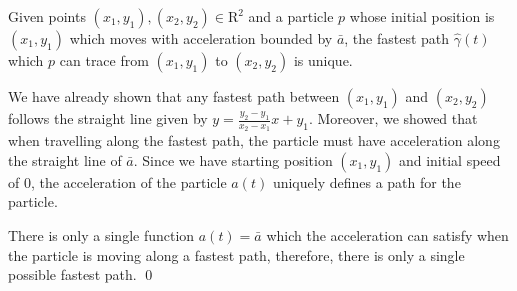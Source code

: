 \begin{corollary}
  Given points $(x_1, y_1), (x_2, y_2) \in \mathrm{R}^2$ and a particle $p$ whose initial position is $(x_1, y_1)$ which moves with acceleration bounded by $\bar{a}$, the fastest path $\hat{\gamma}(t)$ which $p$ can trace from $(x_1, y_1)$ to $(x_2, y_2)$ is unique.
\end{corollary}
\proof We have already shown that any fastest path between $(x_1, y_1)$ and $(x_2, y_2)$ follows the straight line given by $y = \frac{y_2 - y_1}{x_2 - x_1} x + y_1$. Moreover, we showed that when travelling along the fastest path, the particle must have acceleration along the straight line of $\bar{a}$. Since we have starting position $(x_1, y_1)$ and initial speed of $0$, the acceleration of the particle $a(t)$ uniquely defines a path for the particle.

There is only a single function $a(t) = \bar{a}$ which the acceleration can satisfy when the particle is moving along a fastest path, therefore, there is only a single possible fastest path.
\qed


